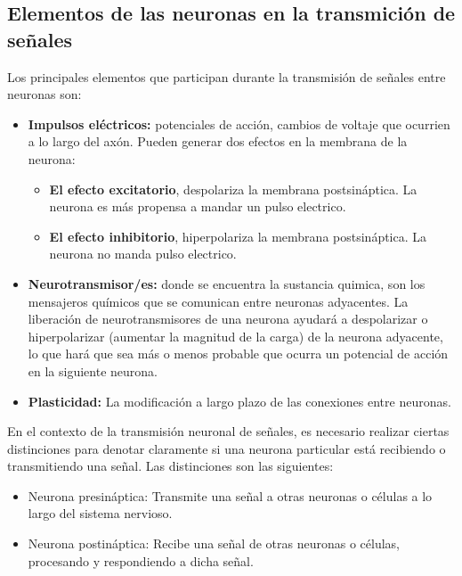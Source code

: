 \subsection{Elementos de las neuronas en la transmición de señales}

Los principales elementos que participan durante la transmisión de señales entre neuronas son:


\begin{itemize}
\item \textbf{Impulsos eléctricos:} potenciales de acción, cambios de voltaje que ocurrien a lo largo del axón. %
Pueden generar dos efectos en la membrana de la neurona: 
	\begin{itemize}
	\item \textbf{El efecto excitatorio}, despolariza la membrana postsináptica. La neurona es más propensa a mandar un pulso electrico.  
	\item \textbf{El efecto inhibitorio}, hiperpolariza la membrana postsináptica. La neurona no manda pulso electrico.

	\end{itemize}

\item \textbf{Neurotransmisor/es:} donde se encuentra la sustancia quimica, %
son los mensajeros químicos que se comunican entre neuronas adyacentes. La liberación de neurotransmisores de una neurona ayudará a despolarizar o hiperpolarizar (aumentar la magnitud de la carga) de la neurona adyacente, lo que hará que sea más o menos probable que ocurra un potencial de acción en la siguiente neurona.
 
\item \textbf{Plasticidad:} La modificación a largo plazo de las conexiones entre neuronas. %
\end{itemize}



En el contexto de la transmisión neuronal de señales, es necesario realizar ciertas distinciones para denotar claramente si una neurona particular está recibiendo o transmitiendo una señal. Las distinciones son las siguientes:
 \begin{itemize}
  \item Neurona presináptica: Transmite una señal a otras neuronas o células a lo largo del sistema nervioso.
  \item Neurona postináptica: Recibe una señal de otras neuronas o células, procesando y respondiendo a dicha señal.
 \end{itemize}  

